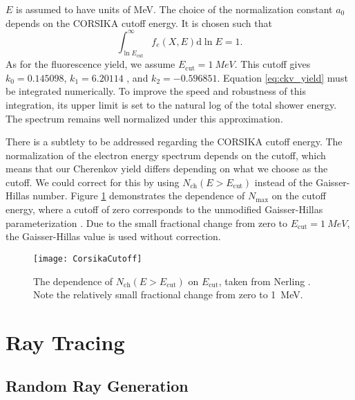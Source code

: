 $E$ is assumed to have units of \si{MeV}. The choice of the normalization constant $a_0$ depends on the CORSIKA cutoff energy. It is chosen such that
\begin{equation}
    \int^{\infty}_{\ln{E_\text{cut}}} f_e(X, E) \text{d} \ln{E} = 1.
\end{equation}
As for the fluorescence yield, we assume $E_\text{cut} = \SI{1}{MeV}$. This cutoff gives  $k_0 = \num{0.145098}$, $k_1 = \num{6.20114}$ , and $k_2 = \num{-0.596851}$. Equation \ref{eq:ckv_yield} must be integrated numerically. To improve the speed and robustness of this integration, its upper limit is set to the natural log of the total shower energy. The spectrum remains well normalized under this approximation. 

There is a subtlety to be addressed regarding the CORSIKA cutoff energy. The normalization of the electron energy spectrum depends on the cutoff, which means that our Cherenkov yield differs depending on what we choose as the cutoff. We could correct for this by using $N_\text{ch}(E > E_\text{cut})$ instead of the Gaisser-Hillas number. Figure \ref{fig:corsika_cut} demonstrates the dependence of $N_\text{max}$ on the cutoff energy, where a cutoff of zero corresponds to the unmodified Gaisser-Hillas parameterization \cite{nerling2006electron}. Due to the small fractional change from zero to $E_\text{cut} = \SI{1}{MeV}$, the Gaisser-Hillas value is used without correction.

\begin{figure}[!ht]
    \label{fig:corsika_cut}
    \centering
    \texttt{[image: CorsikaCutoff]}
    \caption{The dependence of $N_\text{ch}(E > E_\text{cut})$ on $E_\text{cut}$, taken from Nerling \cite{nerling2006electron}. Note the relatively small fractional change from zero to \SI{1}{MeV}.}
\end{figure}

\section{Ray Tracing}

\subsection{Random Ray Generation} \label{sec:generation}

